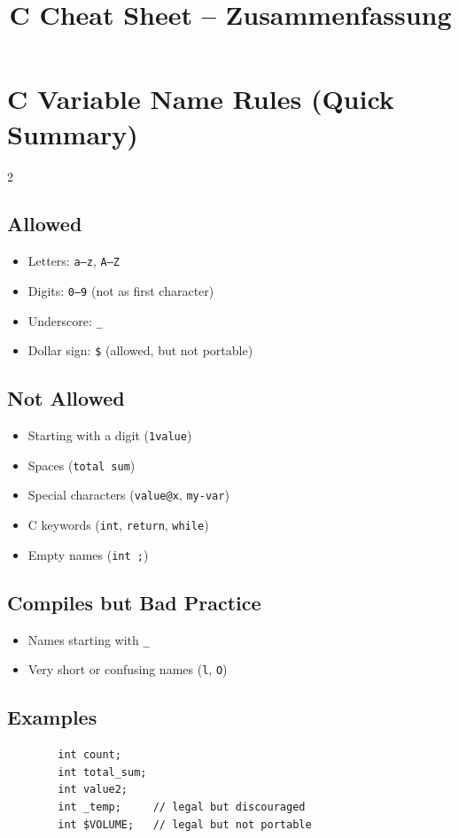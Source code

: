 \documentclass[a4paper,9pt]{article}
\title{C Cheat Sheet – Zusammenfassung}
\author{}
\date{}
\begin{document}
    
    \section{C Variable Name Rules (Quick Summary)}
    \begin{multicols}{2}
        \subsection*{Allowed}
        \begin{itemize}
            \item Letters: \texttt{a--z}, \texttt{A--Z}
            \item Digits: \texttt{0--9} (not as first character)
            \item Underscore: \texttt{\_}
            \item Dollar sign: \texttt{\$} (allowed, but not portable)
        \end{itemize}
        
        \subsection*{Not Allowed}
        \begin{itemize}
            \item Starting with a digit (\texttt{1value})
            \item Spaces (\texttt{total sum})
            \item Special characters (\texttt{value@x}, \texttt{my-var})
            \item C keywords (\texttt{int}, \texttt{return}, \texttt{while})
            \item Empty names (\texttt{int ;})
        \end{itemize}
        
        \subsection*{Compiles but Bad Practice}
        \begin{itemize}
            \item Names starting with \texttt{\_}
            \item Very short or confusing names (\texttt{l}, \texttt{O})
        \end{itemize}
        
        \subsection*{Examples}
        \begin{lstlisting}
        int count;
        int total_sum;
        int value2;
        int _temp;     // legal but discouraged
        int $VOLUME;   // legal but not portable
        \end{lstlisting}
    \end{multicols}
    
\end{document}
